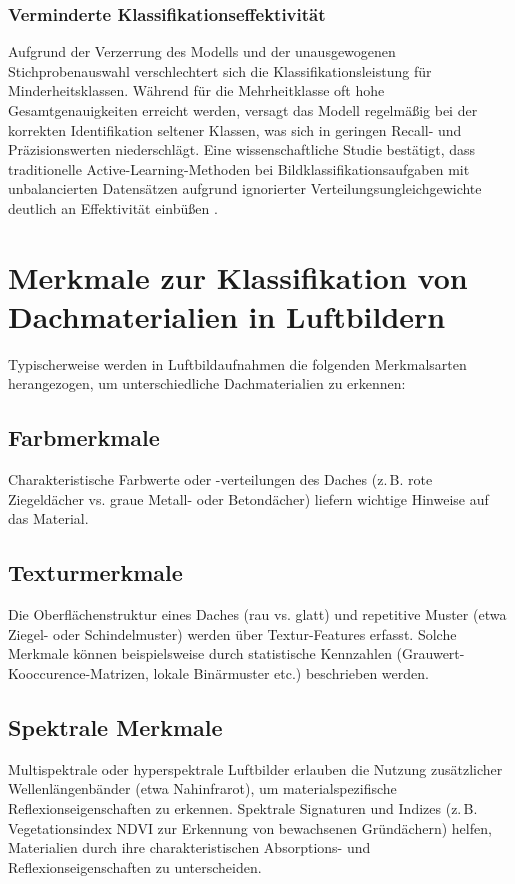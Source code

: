 \documentclass{article}
\begin{document}
	\subsubsection{Verminderte Klassifikationseffektivität}
	Aufgrund der Verzerrung des Modells und der unausgewogenen Stichprobenauswahl verschlechtert sich die Klassifikationsleistung für Minderheitsklassen. Während für die Mehrheitklasse oft hohe Gesamtgenauigkeiten erreicht werden, versagt das Modell regelmäßig bei der korrekten Identifikation seltener Klassen, was sich in geringen Recall- und Präzisionswerten niederschlägt. Eine wissenschaftliche Studie bestätigt, dass traditionelle Active-Learning-Methoden bei Bildklassifikationsaufgaben mit unbalancierten Datensätzen aufgrund ignorierter Verteilungsungleichgewichte deutlich an Effektivität einbüßen \cite{Jin2022}.
	
	\section{Merkmale zur Klassifikation von Dachmaterialien in Luftbildern}
	Typischerweise werden in Luftbildaufnahmen die folgenden Merkmalsarten herangezogen, um unterschiedliche Dachmaterialien zu erkennen:
	
	\subsection{Farbmerkmale}
	Charakteristische Farbwerte oder -verteilungen des Daches (z.\,B. rote Ziegeldächer vs. graue Metall- oder Betondächer) liefern wichtige Hinweise auf das Material\cite{Kim2021}.
	
	\subsection{Texturmerkmale}
	Die Oberflächenstruktur eines Daches (rau vs. glatt) und repetitive Muster (etwa Ziegel- oder Schindelmuster) werden über Textur-Features erfasst. Solche Merkmale können beispielsweise durch statistische Kennzahlen (Grauwert-Kooccurence-Matrizen, lokale Binärmuster etc.) beschrieben werden\cite{Kim2021}.
	
	\subsection{Spektrale Merkmale}
	Multispektrale oder hyperspektrale Luftbilder erlauben die Nutzung zusätzlicher Wellenlängenbänder (etwa Nahinfrarot), um materialspezifische Reflexionseigenschaften zu erkennen. Spektrale Signaturen und Indizes (z.\,B. Vegetationsindex NDVI zur Erkennung von bewachsenen Gründächern) helfen, Materialien durch ihre charakteristischen Absorptions- und Reflexionseigenschaften zu unterscheiden\cite{Kim2021}.
	
\end{document}
